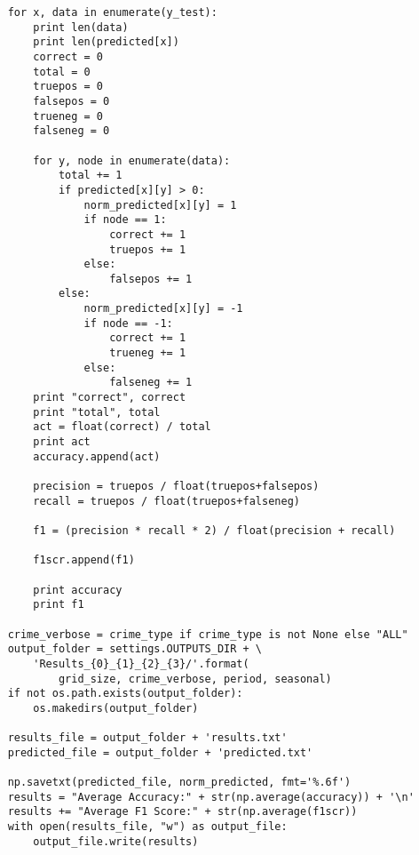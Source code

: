 \begin{small}
\begin{verbatim}
    for x, data in enumerate(y_test):
        print len(data)
        print len(predicted[x])
        correct = 0
        total = 0
        truepos = 0
        falsepos = 0
        trueneg = 0
        falseneg = 0

        for y, node in enumerate(data):
            total += 1
            if predicted[x][y] > 0:
                norm_predicted[x][y] = 1
                if node == 1:
                    correct += 1
                    truepos += 1
                else:
                    falsepos += 1
            else:
                norm_predicted[x][y] = -1
                if node == -1:
                    correct += 1
                    trueneg += 1
                else:
                    falseneg += 1
        print "correct", correct
        print "total", total
        act = float(correct) / total
        print act
        accuracy.append(act)

        precision = truepos / float(truepos+falsepos)
        recall = truepos / float(truepos+falseneg)

        f1 = (precision * recall * 2) / float(precision + recall)

        f1scr.append(f1)

        print accuracy
        print f1

    crime_verbose = crime_type if crime_type is not None else "ALL"
    output_folder = settings.OUTPUTS_DIR + \
        'Results_{0}_{1}_{2}_{3}/'.format(
            grid_size, crime_verbose, period, seasonal)
    if not os.path.exists(output_folder):
        os.makedirs(output_folder)

    results_file = output_folder + 'results.txt'
    predicted_file = output_folder + 'predicted.txt'

    np.savetxt(predicted_file, norm_predicted, fmt='%.6f')
    results = "Average Accuracy:" + str(np.average(accuracy)) + '\n'
    results += "Average F1 Score:" + str(np.average(f1scr))
    with open(results_file, "w") as output_file:
        output_file.write(results)

\end{verbatim}
\end{small}